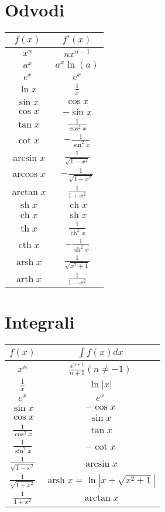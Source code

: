 \documentclass[a4paper,oneside,8pt]{extarticle}
\title{\Title}
\author{\Author}
\date{\today}
\theoremstyle{definition}
\DeclareMathOperator\ch{ch}
\DeclareMathOperator\sh{sh}
\DeclareMathOperator\Th{th}  %
\DeclareMathOperator\cth{cth}
\DeclareMathOperator\arsh{arsh}
\DeclareMathOperator\arth{arth}
\newcommand\abs[1]{\left|#1\right|}
\begin{document}
\begin{multicols}{2}
	\section*{Odvodi}
	\begin{tabular}[h]{|c|c|}
		\hline
		$f(x)$ & $f'(x)$ \\
		\hline
		$x^n$ & $nx^{n-1}$\\
		$a^x$ & $a^x\ln(a)$\\
		$e^x$ & $e^x$\\
		$\ln{x}$ & $\frac{1}{x}$\\
		$\sin{x}$ & $\cos{x}$\\
		$\cos{x}$ & $-\sin{x}$\\
		$\tan{x}$ & $\frac{1}{\cos^2{x}}$\\
		$\cot{x}$ & $-\frac{1}{\sin^2{x}}$\\
		$\arcsin{x}$ & $\frac{1}{\sqrt{1-x^2}}$\\
		$\arccos{x}$ & $-\frac{1}{\sqrt{1-x^2}}$\\
		$\arctan{x}$ & $\frac{1}{1+x^2}$\\
		$\sh{x}$ & $\ch{x}$\\
		$\ch{x}$ & $\sh{x}$\\
		$\Th{x}$ & $\frac{1}{\ch^2{x}}$\\
		$\cth{x}$ & $-\frac{1}{\sh^2{x}}$\\
		$\arsh{x}$ & $\frac{1}{\sqrt{x^2+1}}$\\
		$\arth{x}$ & $\frac{1}{1-x^2}$\\
		\hline 
	\end{tabular}
%
	\section*{Integrali}
	\begin{tabular}[h]{|c|c|}
		\hline
		$f(x)$ & $\int f(x)dx$ \\
		\hline
		$x^n$ & $\frac{x^{n+1}}{n+1} (n \neq -1)$ \\
		$\frac{1}{x}$ & $\ln{\abs{x}}$ \\
		$e^x$ & $e^x$\\
		$\sin{x}$ & $-\cos{x}$\\
		$\cos{x}$ & $\sin{x}$\\
		$\frac{1}{\cos^2{x}}$ & $\tan{x}$\\
		$\frac{1}{\sin^2{x}}$ & $-\cot{x}$\\
		$\frac{1}{\sqrt{1-x^2}}$ & $\arcsin{x}$\\
		$\frac{1}{\sqrt{1+x^2}}$ & $\arsh{x} = \ln{\abs{x + \sqrt{x^2 + 1}}}$\\
		$\frac{1}{1+x^2}$ & $\arctan{x}$\\
		\hline 
	\end{tabular}
%

\end{multicols}
\end{document}
